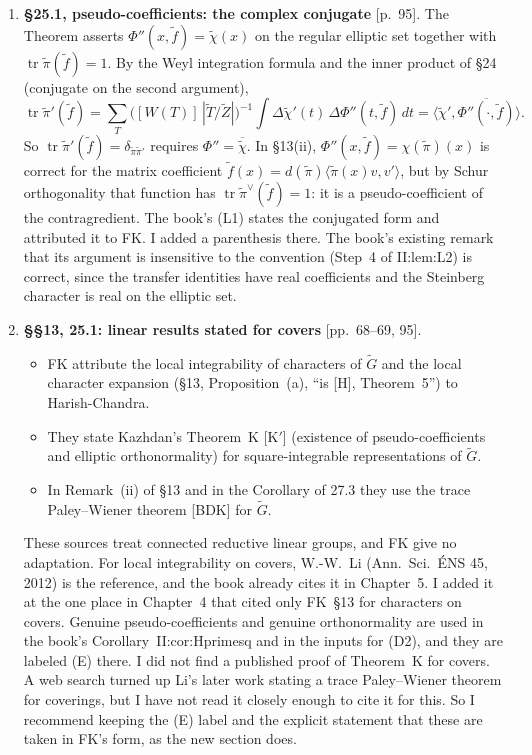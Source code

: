 \documentclass[12pt,letterpaper]{article}
\newcommand{\tr}{\operatorname{tr}}
\newcommand{\tG}{\widetilde G}
\newcommand{\loc}[1]{{\small\textsf{[#1]}}}
\begin{document}
\begin{enumerate}[label=\textbf{F\arabic*.},leftmargin=2.4em]
\item \textbf{\S25.1, pseudo-coefficients: the complex conjugate} \loc{p.~95}. The Theorem asserts $\Phi''(x,\tilde f)=\tilde\chi(x)$ on the regular elliptic set together with $\tr\tilde\pi(\tilde f)=1$. By the Weyl integration formula and the inner product of \S24 (conjugate on the second argument),
\[\tr\tilde\pi'(\tilde f)=\sum_T\big([W(T)]\,|\widetilde T/\widetilde Z|\big)^{-1}\int\Delta\tilde\chi'(t)\,\Delta\Phi''(t,\tilde f)\,dt=\langle\tilde\chi',\overline{\Phi''(\cdot,\tilde f)}\rangle .\]
So $\tr\tilde\pi'(\tilde f)=\delta_{\tilde\pi\tilde\pi'}$ requires $\Phi''=\overline{\tilde\chi}$. In \S13(ii), $\Phi''(x,\tilde f)=\chi(\tilde\pi)(x)$ is correct for the matrix coefficient $\tilde f(x)=d(\tilde\pi)\langle\tilde\pi(x)v,v'\rangle$, but by Schur orthogonality that function has $\tr\tilde\pi^\vee(\tilde f)=1$: it is a pseudo-coefficient of the contragredient. The book's (L1) states the conjugated form and attributed it to FK. I added a parenthesis there. The book's existing remark that its argument is insensitive to the convention (Step~4 of II:lem:L2) is correct, since the transfer identities have real coefficients and the Steinberg character is real on the elliptic set.

\item \textbf{\S\S13, 25.1: linear results stated for covers} \loc{pp.~68--69, 95}.
 \begin{itemize}
 \item FK attribute the local integrability of characters of $\tG$ and the local character expansion (\S13, Proposition~(a), ``is [H], Theorem~5'') to Harish-Chandra.
 \item They state Kazhdan's Theorem~K [K$'$] (existence of pseudo-coefficients and elliptic orthonormality) for square-integrable representations of $\tG$.
 \item In Remark~(ii) of \S13 and in the Corollary of 27.3 they use the trace Paley--Wiener theorem [BDK] for $\tG$.
 \end{itemize}
 These sources treat connected reductive linear groups, and FK give no adaptation. For local integrability on covers, W.-W.~Li (Ann.\ Sci.\ \'ENS 45, 2012) is the reference, and the book already cites it in Chapter~5. I added it at the one place in Chapter~4 that cited only FK~\S13 for characters on covers. Genuine pseudo-coefficients and genuine orthonormality are used in the book's Corollary~II:cor:Hprimesq and in the inputs for (D2), and they are labeled (E) there. I did not find a published proof of Theorem~K for covers. A web search turned up Li's later work stating a trace Paley--Wiener theorem for coverings, but I have not read it closely enough to cite it for this. So I recommend keeping the (E) label and the explicit statement that these are taken in FK's form, as the new section does.


\end{enumerate}
\end{document}
